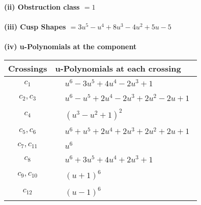 \documentclass[1p]{elsarticle_modified}
\theoremstyle{definition}
\begin{document}
\flushleft \textbf{(ii) Obstruction class $= 1$}\\~\\
\flushleft \textbf{(iii) Cusp Shapes $= 3 u^5- u^4+8 u^3-4 u^2+5 u-5$}\\~\\
\newpage\renewcommand{\arraystretch}{1}
\flushleft \textbf{(iv) u-Polynomials at the component}\newline \\
\begin{tabular}{m{50pt}|m{274pt}}
Crossings & \hspace{64pt}u-Polynomials at each crossing \\
\hline $$\begin{aligned}c_{1}\end{aligned}$$&$\begin{aligned}
&u^6-3 u^5+4 u^4-2 u^3+1
\end{aligned}$\\
\hline $$\begin{aligned}c_{2},c_{3}\end{aligned}$$&$\begin{aligned}
&u^6- u^5+2 u^4-2 u^3+2 u^2-2 u+1
\end{aligned}$\\
\hline $$\begin{aligned}c_{4}\end{aligned}$$&$\begin{aligned}
&(u^3- u^2+1)^2
\end{aligned}$\\
\hline $$\begin{aligned}c_{5},c_{6}\end{aligned}$$&$\begin{aligned}
&u^6+u^5+2 u^4+2 u^3+2 u^2+2 u+1
\end{aligned}$\\
\hline $$\begin{aligned}c_{7},c_{11}\end{aligned}$$&$\begin{aligned}
&u^6
\end{aligned}$\\
\hline $$\begin{aligned}c_{8}\end{aligned}$$&$\begin{aligned}
&u^6+3 u^5+4 u^4+2 u^3+1
\end{aligned}$\\
\hline $$\begin{aligned}c_{9},c_{10}\end{aligned}$$&$\begin{aligned}
&(u+1)^6
\end{aligned}$\\
\hline $$\begin{aligned}c_{12}\end{aligned}$$&$\begin{aligned}
&(u-1)^6
\end{aligned}$\\
\hline
\end{tabular}\\~\\
\end{document}

